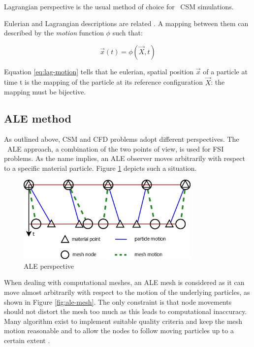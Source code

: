 Lagrangian perspective is the usual method of choice for ~\ac{CSM} simulations.

Eulerian and Lagrangian descriptions are related \cite{bertram2012elasticity}. A mapping between them can described by the \textit{motion} function $\phi$ such that:


\begin{equation}
\vec{x}(t) = \phi(\vec{X}, t)
\label{eq:lag-motion}
\end{equation}

Equation \ref{eq:lag-motion} tells that he eulerian, spatial position $\vec{x}$ of a particle at time t is the
mapping of the particle at its reference configuration $\vec{X}$: the mapping must be bijective.

\subsection{ALE method}
\label{subsec:ALE}

As outlined above, CSM and CFD problems adopt different perspectives. The ~\ac{ALE} approach, a combination of the two points of view, is used for FSI problems. As the name implies, an ALE observer moves arbitrarily with respect to a specific material particle.
Figure \ref{fig:ale} depicts such a situation.

\begin{figure}[htbp!]
	\centering
	\includegraphics[width=0.8\textwidth]{images/ale}
	\caption{ALE perspective}
	\label{fig:ale}
\end{figure}

When dealing with computational meshes, an ALE mesh is considered as it can move almost arbitrarily with respect to the motion of the underlying particles, as shown in Figure \ref{fig:ale-mesh}.
The only constraint is that node movements should not distort the mesh too much as this leads to computational inaccuracy. Many algorithm exist to implement suitable quality criteria and keep the mesh motion reasonable and to allow the nodes to follow moving particles up to a certain extent \cite{de2007mesh}.

